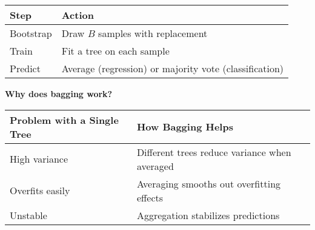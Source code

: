 \begin{table}[!htp]
    \centering
    \begin{tabular}{@{} l l @{}}
        \toprule
        Step & Action \\
        \midrule
        Bootstrap   & Draw $B$ samples with replacement                      \\ [.3em]
        Train       & Fit a tree on each sample                              \\ [.3em]
        Predict     & Average (regression) or majority vote (classification) \\
        \bottomrule
    \end{tabular}
\end{table}

\newpage

\begin{flushleft}
    \textcolor{Green3}{ \textbf{Why does bagging work?}}
\end{flushleft}

\begin{table}[!htp]
    \centering
    \begin{tabular}{@{} l l @{}}
        \toprule
        Problem with a Single Tree & How Bagging Helps \\
        \midrule
        High variance   & Different trees reduce variance when averaged \\ [.3em]
        Overfits easily & Averaging smooths out overfitting effects     \\ [.3em]
        Unstable        & Aggregation stabilizes predictions            \\
        \bottomrule
    \end{tabular}
\end{table}